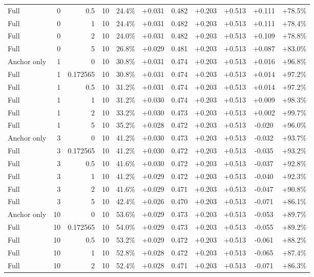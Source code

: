 \begin{table}[htbp]
\begin{tabular}{lrrrccccccc}
Full & 0 & 0.5 & 10 & 24.4\% & +0.031 & 0.482 & +0.203 & +0.513 & +0.111 & +78.5\% \\
Full & 0 & 1 & 10 & 24.4\% & +0.031 & 0.482 & +0.203 & +0.513 & +0.111 & +78.4\% \\
Full & 0 & 2 & 10 & 24.0\% & +0.031 & 0.482 & +0.203 & +0.513 & +0.109 & +78.8\% \\
Full & 0 & 5 & 10 & 26.8\% & +0.029 & 0.481 & +0.203 & +0.513 & +0.087 & +83.0\% \\
Anchor only & 1 & 0 & 10 & 30.8\% & +0.031 & 0.474 & +0.203 & +0.513 & +0.016 & +96.8\% \\
Full & 1 & 0.172565 & 10 & 30.8\% & +0.031 & 0.474 & +0.203 & +0.513 & +0.014 & +97.2\% \\
Full & 1 & 0.5 & 10 & 31.2\% & +0.031 & 0.474 & +0.203 & +0.513 & +0.014 & +97.2\% \\
Full & 1 & 1 & 10 & 31.2\% & +0.030 & 0.474 & +0.203 & +0.513 & +0.009 & +98.3\% \\
Full & 1 & 2 & 10 & 33.2\% & +0.030 & 0.473 & +0.203 & +0.513 & +0.002 & +99.7\% \\
Full & 1 & 5 & 10 & 35.2\% & +0.028 & 0.472 & +0.203 & +0.513 & -0.020 & +96.0\% \\
Anchor only & 3 & 0 & 10 & 41.2\% & +0.030 & 0.473 & +0.203 & +0.513 & -0.032 & +93.7\% \\
Full & 3 & 0.172565 & 10 & 41.2\% & +0.030 & 0.472 & +0.203 & +0.513 & -0.035 & +93.2\% \\
Full & 3 & 0.5 & 10 & 41.6\% & +0.030 & 0.472 & +0.203 & +0.513 & -0.037 & +92.8\% \\
Full & 3 & 1 & 10 & 41.2\% & +0.029 & 0.472 & +0.203 & +0.513 & -0.040 & +92.3\% \\
Full & 3 & 2 & 10 & 41.6\% & +0.029 & 0.471 & +0.203 & +0.513 & -0.047 & +90.8\% \\
Full & 3 & 5 & 10 & 42.4\% & +0.026 & 0.470 & +0.203 & +0.513 & -0.071 & +86.1\% \\
Anchor only & 10 & 0 & 10 & 53.6\% & +0.029 & 0.473 & +0.203 & +0.513 & -0.053 & +89.7\% \\
Full & 10 & 0.172565 & 10 & 54.0\% & +0.029 & 0.473 & +0.203 & +0.513 & -0.055 & +89.2\% \\
Full & 10 & 0.5 & 10 & 53.2\% & +0.029 & 0.472 & +0.203 & +0.513 & -0.061 & +88.2\% \\
Full & 10 & 1 & 10 & 52.8\% & +0.028 & 0.472 & +0.203 & +0.513 & -0.065 & +87.4\% \\
Full & 10 & 2 & 10 & 52.4\% & +0.028 & 0.471 & +0.203 & +0.513 & -0.071 & +86.3\% \\

\end{tabular}
\end{table}
